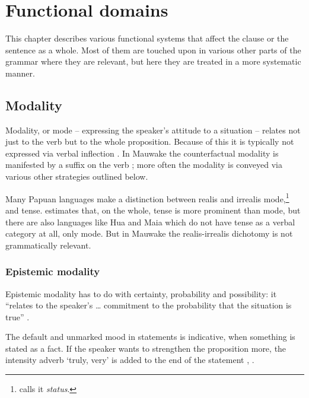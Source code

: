 
\chapter{Functional domains}

This chapter describes various functional systems that affect the clause or the sentence as a whole.  Most of them are touched upon in various other parts of the grammar where they are relevant, but here they are treated in a more systematic manner.

\section{Modality} \label{sec:6.1}

Modality, or mode -- expressing the speaker's attitude to a situation -- relates not just to the verb but to the whole proposition. Because of this it is typically not expressed via verbal inflection \citep[22]{Bybee1985}.  In Mauwake the counterfactual modality is manifested by a suffix on the verb 
; more often the modality is conveyed via various other strategies outlined below.

Many Papuan languages make a distinction between realis and irrealis mode,\footnote{\citet[158]{Foley1986} calls it \textit{status}.} and tense. \citet[162]{Foley1986} estimates that, on the whole, tense is more prominent than mode, but there are also languages like Hua \citep{Haiman1980} and Maia \citep{Hardin2002} which do not have tense as a verbal category at all, only mode. But in Mauwake the realis-irrealis dichotomy is not grammatically relevant. 

\subsection{Epistemic modality}

Epistemic modality has to do with certainty, probability and possibility: it ``relates to the speaker's {\dots} commitment to the probability that the situation is true'' \citep[234]{Payne1997}.  

The default  and unmarked mood in statements is indicative, when something is stated as a fact. If the speaker wants to strengthen the proposition more, the intensity adverb  `truly, very' is added to the end of the statement , .

